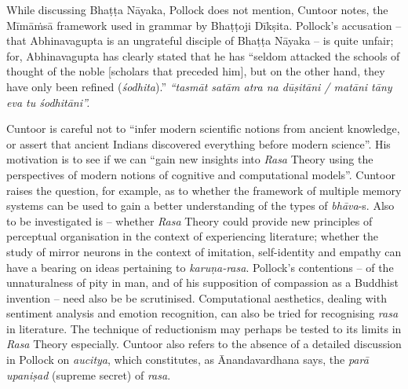While discussing Bhaṭṭa Nāyaka, Pollock does not mention, Cuntoor notes, the Mīmāṁsā framework used in grammar by Bhaṭṭoji Dīkṣita. Pollock's accusation -- that Abhinavagupta is an ungrateful disciple of Bhaṭṭa Nāyaka -- is quite unfair; for, Abhinavagupta has clearly stated that he has “seldom attacked the schools of thought of the noble [scholars that preceded him], but on the other hand, they have only been refined (\textsl{śodhita}).” \textsl{“tasmāt satām atra na dūṣitāni / matāni tāny eva tu śodhitāni”.}

Cuntoor is careful not to “infer modern scientific notions from ancient knowledge, or assert that ancient Indians discovered everything before modern science”. His motivation is to see if we can “gain new insights into \textsl{Rasa} Theory using the perspectives of modern notions of cognitive and computational models”. Cuntoor raises the question, for example, as to whether the framework of multiple memory systems can be used to gain a better understanding of the types of \textsl{bhāva}-s. Also to be investigated is -- whether \textsl{Rasa} Theory could provide new principles of perceptual organisation in the context of experiencing literature; whether the study of mirror neurons in the context of imitation, self-identity and empathy can have a bearing on ideas pertaining to \textsl{karuṇa-rasa}. Pollock's contentions -- of the unnaturalness of pity in man, and of his supposition of compassion as a Buddhist invention -- need also be be scrutinised. Computational aesthetics, dealing with sentiment analysis and emotion recognition, can also be tried for recognising \textsl{rasa} in literature. The technique of reductionism may perhaps be tested to its limits in \textsl{Rasa} Theory especially. Cuntoor also refers to the absence of a detailed discussion in Pollock on \textsl{aucitya}, which constitutes, as Ānandavardhana says, the \textsl{parā upaniṣad} (supreme secret) of \textsl{rasa}.

